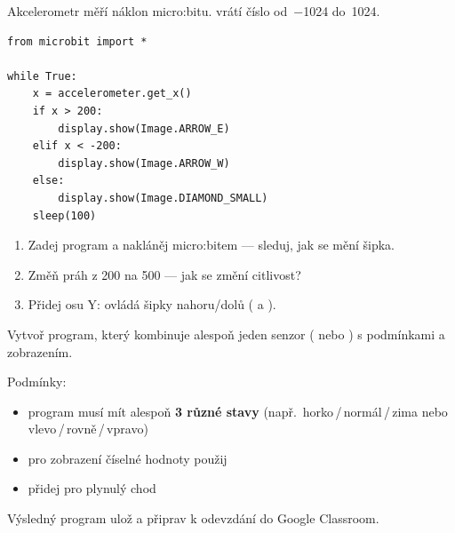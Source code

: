 \begin{ukol}[Teploměr]
\end{ukol}

\begin{ukol}

Akcelerometr měří náklon micro:bitu.
 vrátí číslo od~−1024 do~1024.

\begin{lstlisting}
from microbit import *

while True:
    x = accelerometer.get_x()
    if x > 200:
        display.show(Image.ARROW_E)
    elif x < -200:
        display.show(Image.ARROW_W)
    else:
        display.show(Image.DIAMOND_SMALL)
    sleep(100)
\end{lstlisting}

\begin{enumerate}
  \item Zadej program a nakláněj micro:bitem — sleduj, jak se mění šipka.
  \item Změň práh z 200 na 500 — jak se změní citlivost?
  \item Přidej osu Y:  ovládá šipky nahoru/dolů
        ( a ).
\end{enumerate}

\odpoved[2cm]

\end{ukol}

\begin{ukol}

Vytvoř program, který kombinuje alespoň jeden senzor
( nebo ) s podmínkami a zobrazením.

\medskip
Podmínky:
\begin{itemize}
  \item program musí mít alespoň \textbf{3 různé stavy}
        (např.\ horko\,/\,normál\,/\,zima nebo vlevo\,/\,rovně\,/\,vpravo)
  \item pro zobrazení číselné hodnoty použij 
  \item přidej  pro plynulý chod
\end{itemize}

\odpoved[5cm]

\noindent Výsledný program ulož a připrav k odevzdání do Google Classroom.

\end{ukol}

